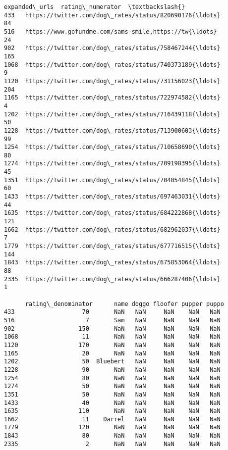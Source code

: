 \documentclass[11pt]{article}
\begin{document}
\begin{tcolorbox}[breakable, size=fbox, boxrule=.5pt, pad at break*=1mm, opacityfill=0]
\begin{Verbatim}[commandchars=\\\{\}]
                                          expanded\_urls  rating\_numerator  \textbackslash{}
433   https://twitter.com/dog\_rates/status/820690176{\ldots}                84
516   https://www.gofundme.com/sams-smile,https://tw{\ldots}                24
902   https://twitter.com/dog\_rates/status/758467244{\ldots}               165
1068  https://twitter.com/dog\_rates/status/740373189{\ldots}                 9
1120  https://twitter.com/dog\_rates/status/731156023{\ldots}               204
1165  https://twitter.com/dog\_rates/status/722974582{\ldots}                 4
1202  https://twitter.com/dog\_rates/status/716439118{\ldots}                50
1228  https://twitter.com/dog\_rates/status/713900603{\ldots}                99
1254  https://twitter.com/dog\_rates/status/710658690{\ldots}                80
1274  https://twitter.com/dog\_rates/status/709198395{\ldots}                45
1351  https://twitter.com/dog\_rates/status/704054845{\ldots}                60
1433  https://twitter.com/dog\_rates/status/697463031{\ldots}                44
1635  https://twitter.com/dog\_rates/status/684222868{\ldots}               121
1662  https://twitter.com/dog\_rates/status/682962037{\ldots}                 7
1779  https://twitter.com/dog\_rates/status/677716515{\ldots}               144
1843  https://twitter.com/dog\_rates/status/675853064{\ldots}                88
2335  https://twitter.com/dog\_rates/status/666287406{\ldots}                 1

      rating\_denominator      name doggo floofer pupper puppo
433                   70       NaN   NaN     NaN    NaN   NaN
516                    7       Sam   NaN     NaN    NaN   NaN
902                  150       NaN   NaN     NaN    NaN   NaN
1068                  11       NaN   NaN     NaN    NaN   NaN
1120                 170       NaN   NaN     NaN    NaN   NaN
1165                  20       NaN   NaN     NaN    NaN   NaN
1202                  50  Bluebert   NaN     NaN    NaN   NaN
1228                  90       NaN   NaN     NaN    NaN   NaN
1254                  80       NaN   NaN     NaN    NaN   NaN
1274                  50       NaN   NaN     NaN    NaN   NaN
1351                  50       NaN   NaN     NaN    NaN   NaN
1433                  40       NaN   NaN     NaN    NaN   NaN
1635                 110       NaN   NaN     NaN    NaN   NaN
1662                  11    Darrel   NaN     NaN    NaN   NaN
1779                 120       NaN   NaN     NaN    NaN   NaN
1843                  80       NaN   NaN     NaN    NaN   NaN
2335                   2       NaN   NaN     NaN    NaN   NaN
\end{Verbatim}
\end{tcolorbox}
        
\end{document}
